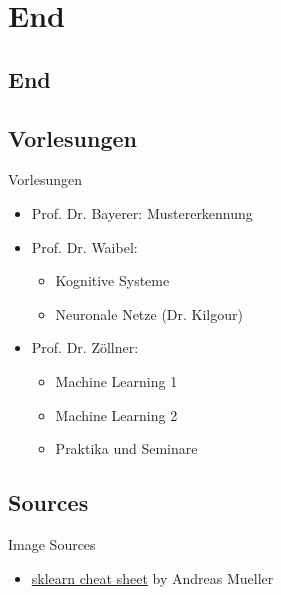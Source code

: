\section*{End}
\subsection*{End}

\subsection{Vorlesungen}
\begin{frame}{Vorlesungen}
    \begin{itemize}
        \item Prof. Dr. Bayerer: Mustererkennung
        \item Prof. Dr. Waibel:
        \begin{itemize}
            \item Kognitive Systeme
            \item Neuronale Netze (Dr. Kilgour)
        \end{itemize}
        \item Prof. Dr. Zöllner:
        \begin{itemize}
            \item Machine Learning 1
            \item Machine Learning 2
            \item Praktika und Seminare
        \end{itemize}
    \end{itemize}
\end{frame}

\subsection*{Sources}
\begin{frame}{Image Sources}
    \begin{itemize}
        \item \href{http://peekaboo-vision.blogspot.de/2013/01/machine-learning-cheat-sheet-for-scikit.html}{sklearn cheat sheet} by  Andreas Mueller
    \end{itemize}
\end{frame}